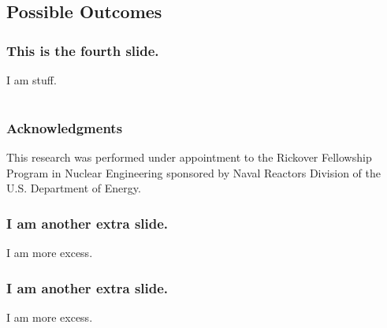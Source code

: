 \documentclass[compress]{beamer}
\begin{document}
\subsection[Possible Outcomes]{Possible Outcomes}
\begin{frame}
\frametitle{This is the fourth slide.}

I am stuff.

\end{frame}
\section*{}
\begin{frame}
\frametitle{Acknowledgments}

This research was performed under appointment to the Rickover Fellowship Program in Nuclear Engineering sponsored by Naval Reactors Division of the U.S. Department of Energy.

\end{frame}
\begin{frame}
\frametitle{I am another extra slide.}

I am more excess.

\end{frame}
\begin{frame}
\frametitle{I am another extra slide.}

I am more excess.

\end{frame}
\end{document}
